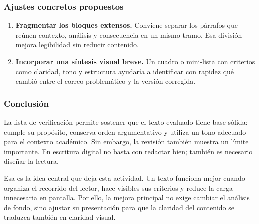 \subsubsection{Ajustes concretos propuestos}

\begin{enumerate}
	\item \textbf{Fragmentar los bloques extensos.} Conviene separar los párrafos que reúnen contexto, análisis y consecuencia en un mismo tramo. Esa división mejora legibilidad sin reducir contenido.
	\item \textbf{Incorporar una síntesis visual breve.} Un cuadro o mini-lista con criterios como claridad, tono y estructura ayudaría a identificar con rapidez qué cambió entre el correo problemático y la versión corregida.
\end{enumerate}

\subsubsection{Conclusión}

La lista de verificación permite sostener que el texto evaluado tiene base sólida: cumple su propósito, conserva orden argumentativo y utiliza un tono adecuado para el contexto académico. Sin embargo, la revisión también muestra un límite importante. En escritura digital no basta con redactar bien; también es necesario diseñar la lectura.

Esa es la idea central que deja esta actividad. Un texto funciona mejor cuando organiza el recorrido del lector, hace visibles sus criterios y reduce la carga innecesaria en pantalla. Por ello, la mejora principal no exige cambiar el análisis de fondo, sino ajustar su presentación para que la claridad del contenido se traduzca también en claridad visual.
